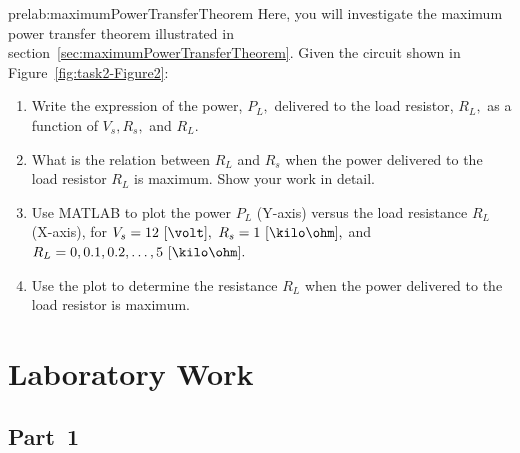 \begin{prelab}{prelab:maximumPowerTransferTheorem}
Here, you will investigate the maximum power transfer theorem illustrated in section~\ref{sec:maximumPowerTransferTheorem}. Given the circuit shown in Figure~\ref{fig:task2-Figure2}:  %
     \begin{enumerate}
     \item Write the expression of the power, $P_L,$ delivered to the load resistor, $R_L,$ as a function of $V_s, R_s,$ and $R_L.$ %
     \item What is the relation between $R_L$ and $R_s$ when the power delivered to the load resistor $R_L$ is maximum. Show your work in detail.
         \item Use MATLAB to plot the power $P_L$ (Y-axis) versus the load resistance $R_L$ (X-axis), for $V_s=12~[\volt],$ $R_s=1~[\kilo\ohm],$ and $R_L=0,0.1,0.2,\ldots,5~[\kilo\ohm].$
           
         \item Use the plot to determine the resistance $R_L$ when the power delivered to the load resistor is maximum. 
         \end{enumerate}
 
\end{prelab}

 
\section{Laboratory Work}

\subsection{Part~1}
\label{sec:part1}


